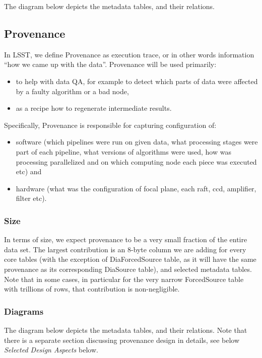 \documentclass[DM,toc]{lsstdoc}
\begin{document}
The diagram below depicts the metadata tables, and their relations.

\subsection{Provenance}

In LSST, we define Provenance as execution trace, or in other words information ``how we came up with the data''. Provenance will be used primarily:
%
\begin{itemize}
  \item to help with data QA, for example to detect which parts of data were affected by a faulty algorithm or a bad node,
  \item as a recipe how to regenerate intermediate results.
\end{itemize}

Specifically, Provenance is responsible for capturing configuration of:
%
\begin{itemize}
  \item software (which pipelines were run on given data, what processing stages were part of each pipeline, what versions of algorithms were used, how was processing parallelized and on which computing node each piece was executed etc) and
  \item hardware (what was the configuration of focal plane, each raft, ccd, amplifier, filter etc).
\end{itemize}

\subsubsection{Size}

In terms of size, we expect provenance to be a very small fraction of the entire data set. The largest contribution is an 8-byte column we are adding for every core tables (with the exception of DiaForcedSource table, as it will have the same provenance as its corresponding DiaSource table), and selected metadata tables. Note that in some cases, in particular for the very narrow ForcedSource table with trillions of rows, that contribution is non-negligible.

\subsubsection{Diagrams}

The diagram below depicts the metadata tables, and their relations. Note that there is a separate section discussing provenance design in details, see below \textit{Selected Design Aspects} below.
\end{document}
